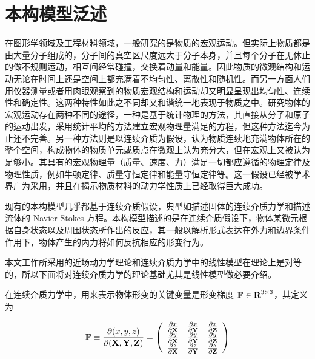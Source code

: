\section{本构模型泛述}
\label{constitutive_model}
在图形学领域及工程材料领域，一般研究的是物质的宏观运动。但实际上物质都是由大量分子组成的，分子间的真空区尺度远大于分子本身，并且每个分子在无休止的做不规则运动，相互间经常碰撞，交换着动量和能量。因此物质的微观结构和运动无论在时间上还是空间上都充满着不均匀性、离散性和随机性。而另一方面人们用仪器测量或者用肉眼观察到的物质宏观结构和运动却又明显呈现出均匀性、连续性和确定性。这两种特性如此之不同却又和谐统一地表现于物质之中。研究物体的宏观运动存在两种不同的途径，一种是基于统计物理的方法，其直接从分子和原子的运动出发，采用统计平均的方法建立宏观物理量满足的方程，但这种方法迄今为止还不完善。另一种方法则是以连续介质为假设，认为物质连续地充满物体所在的整个空间，构成物体的物质单元或质点在微观上认为充分大，但在宏观上又被认为足够小。其具有的宏观物理量（质量、速度、力）满足一切都应遵循的物理定律及物理性质，例如牛顿定律、质量守恒定律和能量守恒定律等。这一假设已经被学术界广为采用，并且在揭示物质材料的动力学性质上已经取得巨大成功。

现有的本构模型几乎都基于连续介质假设，典型如描述固体的连续介质力学和描述流体的 Navier-Stokes 方程。本构模型描述的是在连续介质假设下，物体某微元根据自身状态以及周围状态所作出的反应，其一般以解析形式表达在外力和边界条件作用下，物体产生的内力将如何反抗相应的形变行为。

本文工作所采用的近场动力学理论和连续介质力学中的线性模型在理论上是对等的，所以下面将对连续介质力学的理论基础尤其是线性模型做必要介绍。

在连续介质力学中，用来表示物体形变的关键变量是形变梯度 $\textbf{F} \in \textbf{R}^{3\times3}$，其定义为

\begin{equation}
\textbf{F} \equiv \frac{\partial(\boldmath{x}, \boldmath{y}, \boldmath{z})}{\partial(\textbf{X}, \textbf{Y}, \textbf{Z})}
=
\left(
  \begin{array}{ccc}
    \frac{\partial\boldmath{x}}{\partial\textbf{X}}& \frac{\partial\boldmath{x}}{\partial\textbf{Y}} & \frac{\partial\boldmath{x}}{\partial\textbf{Z}} \\
    \frac{\partial\boldmath{y}}{\partial\textbf{X}}& \frac{\partial\boldmath{y}}{\partial\textbf{Y}} & \frac{\partial\boldmath{y}}{\partial\textbf{Z}} \\
    \frac{\partial\boldmath{z}}{\partial\textbf{X}}& \frac{\partial\boldmath{z}}{\partial\textbf{Y}} & \frac{\partial\boldmath{z}}{\partial\textbf{Z}} \\
  \end{array}
\right)
\end{equation}


